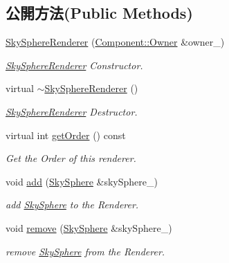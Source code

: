 \subsection*{公開方法(Public Methods)}
\begin{DoxyCompactItemize}
\item 
\hyperlink{class_i_dream_sky_1_1_sky_sphere_renderer_a9aed4d21b3a24a99a7bd0ff0578444db}{Sky\+Sphere\+Renderer} (\hyperlink{class_i_dream_sky_1_1_component_1_1_owner}{Component\+::\+Owner} \&owner\+\_\+)
\begin{DoxyCompactList}\small\item\em \hyperlink{class_i_dream_sky_1_1_sky_sphere_renderer}{Sky\+Sphere\+Renderer} Constructor. \end{DoxyCompactList}\item 
virtual \hyperlink{class_i_dream_sky_1_1_sky_sphere_renderer_a09e3b09dd3065cdc1f67abbe7a3438f0}{$\sim$\+Sky\+Sphere\+Renderer} ()
\begin{DoxyCompactList}\small\item\em \hyperlink{class_i_dream_sky_1_1_sky_sphere_renderer}{Sky\+Sphere\+Renderer} Destructor. \end{DoxyCompactList}\item 
virtual int \hyperlink{class_i_dream_sky_1_1_sky_sphere_renderer_a7f002e11ce48fad92fae9e3815ef77d9}{get\+Order} () const 
\begin{DoxyCompactList}\small\item\em Get the Order of this renderer. \end{DoxyCompactList}\item 
void \hyperlink{class_i_dream_sky_1_1_sky_sphere_renderer_afdbbe20fcef5625c9b94ef665ada1d61}{add} (\hyperlink{class_i_dream_sky_1_1_sky_sphere}{Sky\+Sphere} \&sky\+Sphere\+\_\+)
\begin{DoxyCompactList}\small\item\em add \hyperlink{class_i_dream_sky_1_1_sky_sphere}{Sky\+Sphere} to the Renderer. \end{DoxyCompactList}\item 
void \hyperlink{class_i_dream_sky_1_1_sky_sphere_renderer_a2b7bd339a31bebd9c1770d591ad5f28f}{remove} (\hyperlink{class_i_dream_sky_1_1_sky_sphere}{Sky\+Sphere} \&sky\+Sphere\+\_\+)
\begin{DoxyCompactList}\small\item\em remove \hyperlink{class_i_dream_sky_1_1_sky_sphere}{Sky\+Sphere} from the Renderer. \end{DoxyCompactList}\end{DoxyCompactItemize}
